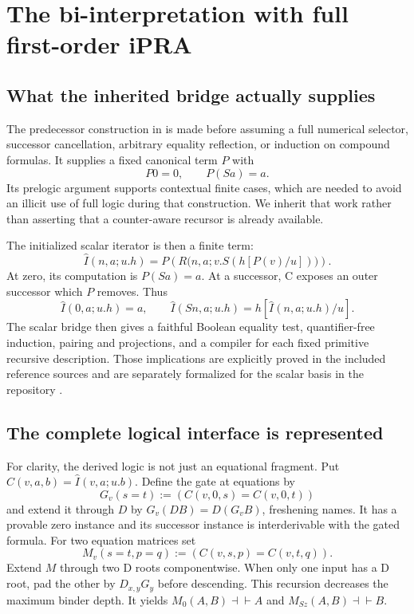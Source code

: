 \documentclass[11pt]{article}
\theoremstyle{definition}\newtheorem{definition}[theorem]{Definition}
\begin{document}
\section{The bi-interpretation with full first-order iPRA}

\subsection{What the inherited bridge actually supplies}

The predecessor construction in \cite{canonical} is made before
assuming a full numerical selector, successor cancellation, arbitrary
equality reflection, or induction on compound formulas. It supplies a
fixed canonical term $P$ with
\[
 P0=0,\qquad P(Sa)=a.
\]
Its prelogic argument supports contextual finite cases, which are
needed to avoid an illicit use of full logic during that construction.
We inherit that work rather than asserting that a counter-aware
recursor is already available.

The initialized scalar iterator is then a finite term:
\[
 \widehat I(n,a;u.h)=
 P\!\left(R\bigl(n,a;v.S(h[P(v)/u])\bigr)\right).
 \tag{Init}\label{eq:init}
\]
At zero, its computation is $P(Sa)=a$. At a successor, C exposes an
outer successor which $P$ removes. Thus
\[
 \widehat I(0,a;u.h)=a,\qquad
 \widehat I(Sn,a;u.h)=h[\widehat I(n,a;u.h)/u].
\]
The scalar bridge then gives a faithful Boolean equality test,
quantifier-free induction, pairing and projections, and a compiler for
each fixed primitive recursive description. Those implications are
explicitly proved in the included reference sources and are separately
formalized for the scalar basis in the repository \cite{native,foundations}.

\subsection{The complete logical interface is represented}

For clarity, the derived logic is not just an equational fragment.
Put $C(v,a,b)=\widehat I(v,a;u.b)$. Define the gate at equations by
\[
 G_v(s=t):=(C(v,0,s)=C(v,0,t))
\]
and extend it through $D$ by $G_v(DB)=D(G_vB)$, freshening names.
It has a provable zero instance and its successor instance is
interderivable with the gated formula. For two equation matrices set
\[
 M_v(s=t,p=q):=(C(v,s,p)=C(v,t,q)).
\]
Extend $M$ through two D roots componentwise. When only one input
has a D root, pad the other by $D_{x,y}G_y$ before descending. This
recursion decreases the maximum binder depth. It yields
$M_0(A,B)\dashv\vdash A$ and $M_{Sz}(A,B)\dashv\vdash B$.
\end{document}
